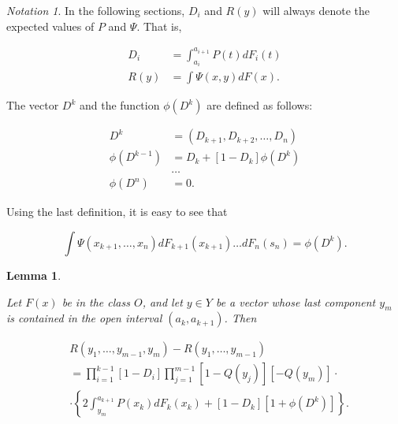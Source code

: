 \documentclass{article}
\newtheorem{lemma}{Lemma}
\theoremstyle{remark}
\newtheorem{notation}{Notation}
\begin{document}
\begin{notation}

In the following sections, $D_i$ and $R(y)$ will always denote the expected
values of $P$ and $\Psi$. That is,

\[
\begin{aligned}
D_i &= \int_{a_i}^{a_{i+1}} P(t) dF_i(t) \\
R(y) &= \int \Psi(x,y) dF(x).
\end{aligned}
\]

\end{notation}

The vector $D^k$ and the function $\phi(D^k)$ are defined as follows:

\[
\begin{aligned}
D^k &= (D_{k+1}, D_{k+2}, \dots, D_n) \\
\phi(D^{k-1}) &= D_k + [1 - D_k] \phi(D^k) \\
& \dots \\
\phi(D^{n}) &= 0.
\end{aligned}
\]

Using the last definition, it is easy to see that

\[
\int \Psi(x_{k+1}, \dots, x_n) dF_{k+1}(x_{k+1}) \dots dF_n(s_n)
= \phi(D^k).
\]

\begin{lemma} \label{lemma:marginal-r-formula}

Let $F(x)$ be in the class $O$, and let $y \in Y$ be a vector whose last
component $y_m$ is contained in the open interval $(a_k, a_{k+1})$. Then

\[
\begin{aligned}
& R(y_1, \dots, y_{m-1}, y_m) - R(y_1, \dots, y_{m-1}) \\
&= \prod_{i=1}^{k-1} [1 - D_i] \prod_{j=1}^{m-1} [1 - Q(y_j)][-Q(y_m)] \cdot \\
&\cdot \left \{
  2 \int_{y_m}^{a_{k+1}} P(x_k) dF_k(x_k) + [1 - D_k][1 + \phi(D^k)]
\right \}.
\end{aligned}
\]

\end{lemma}
\end{document}
